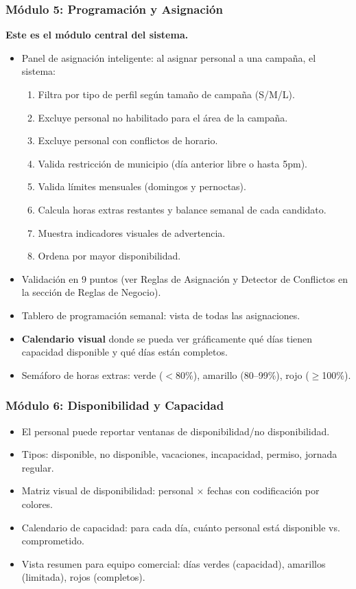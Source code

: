 \documentclass[10pt,a4paper]{article}
\begin{document}
\subsubsection{M\'{o}dulo 5: Programaci\'{o}n y Asignaci\'{o}n}
\textbf{Este es el m\'{o}dulo central del sistema.}
\begin{itemize}[leftmargin=2em]
    \item Panel de asignaci\'{o}n inteligente: al asignar personal a una campaña, el sistema:
    \begin{enumerate}
        \item Filtra por tipo de perfil seg\'{u}n tamaño de campaña (S/M/L).
        \item Excluye personal no habilitado para el \'{a}rea de la campaña.
        \item Excluye personal con conflictos de horario.
        \item Valida restricci\'{o}n de municipio (d\'{i}a anterior libre o hasta 5pm).
        \item Valida l\'{i}mites mensuales (domingos y pernoctas).
        \item Calcula horas extras restantes y balance semanal de cada candidato.
        \item Muestra indicadores visuales de advertencia.
        \item Ordena por mayor disponibilidad.
    \end{enumerate}
    \item Validaci\'{o}n en 9 puntos (ver Reglas de Asignaci\'{o}n y Detector de Conflictos en la secci\'{o}n de Reglas de Negocio).
    \item Tablero de programaci\'{o}n semanal: vista de todas las asignaciones.
    \item \textbf{Calendario visual} donde se pueda ver gr\'{a}ficamente qu\'{e} d\'{i}as tienen capacidad disponible y qu\'{e} d\'{i}as est\'{a}n completos.
    \item Sem\'{a}foro de horas extras: verde ($<$80\%), amarillo (80--99\%), rojo ($\geq$100\%).
\end{itemize}

\subsubsection{M\'{o}dulo 6: Disponibilidad y Capacidad}
\begin{itemize}[leftmargin=2em]
    \item El personal puede reportar ventanas de disponibilidad/no disponibilidad.
    \item Tipos: disponible, no disponible, vacaciones, incapacidad, permiso, jornada regular.
    \item Matriz visual de disponibilidad: personal $\times$ fechas con codificaci\'{o}n por colores.
    \item Calendario de capacidad: para cada d\'{i}a, cu\'{a}nto personal est\'{a} disponible vs. comprometido.
    \item Vista resumen para equipo comercial: d\'{i}as verdes (capacidad), amarillos (limitada), rojos (completos).
\end{itemize}
\end{document}
